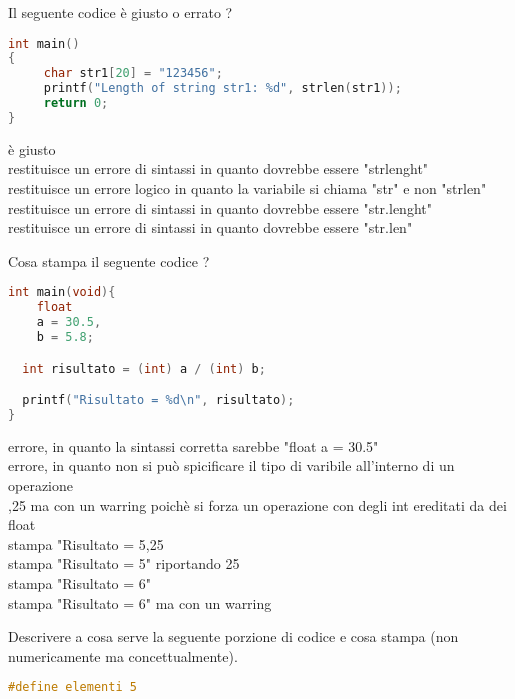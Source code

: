 \documentclass[addpoints,11pt]{exam}
\begin{document}
\begin{questions}

\question[2]
Il seguente codice è giusto o errato ? \\
\begin{lstlisting}[language=C]
int main()
{
     char str1[20] = "123456";
     printf("Length of string str1: %d", strlen(str1));
     return 0;
}
\end{lstlisting}
\begin{oneparcheckboxes}
	\choice è giusto\\
	\choice restituisce un errore di sintassi in quanto dovrebbe essere "strlenght"\\
	\choice restituisce un errore logico in quanto la variabile si chiama "str" e non "strlen"\\
	\choice restituisce un errore di sintassi in quanto dovrebbe essere "str.lenght"\\
	\choice restituisce un errore di sintassi in quanto dovrebbe essere "str.len"\\
\end{oneparcheckboxes}
\newpage


\question[2]
Cosa stampa il seguente codice ?

\begin{lstlisting}[language=C]
int main(void){
    float
    a = 30.5,
    b = 5.8;

  int risultato = (int) a / (int) b;

  printf("Risultato = %d\n", risultato);
}
\end{lstlisting}
\begin{oneparcheckboxes}
	\choice errore, in quanto la sintassi corretta sarebbe "float a = 30.5"\\
	\choice errore, in quanto non si può spicificare il tipo di varibile all'interno di un operazione\\
	,25 ma con un warring poichè si forza un operazione con degli int ereditati da dei float   \\
	\choice stampa "Risultato = 5,25\\
	\choice stampa "Risultato = 5" riportando 25\\
	\choice stampa "Risultato = 6"\\
	\choice stampa "Risultato = 6" ma con un warring\\
\end{oneparcheckboxes}
 

\question[2]
Descrivere a cosa serve la seguente porzione di codice e cosa stampa (non numericamente ma concettualmente).\\
\begin{minipage}[t]{0.5\linewidth}
\begin{lstlisting}[language=C]
#define elementi 5


\end{lstlisting}
\end{minipage}
\end{questions}
\end{document}
